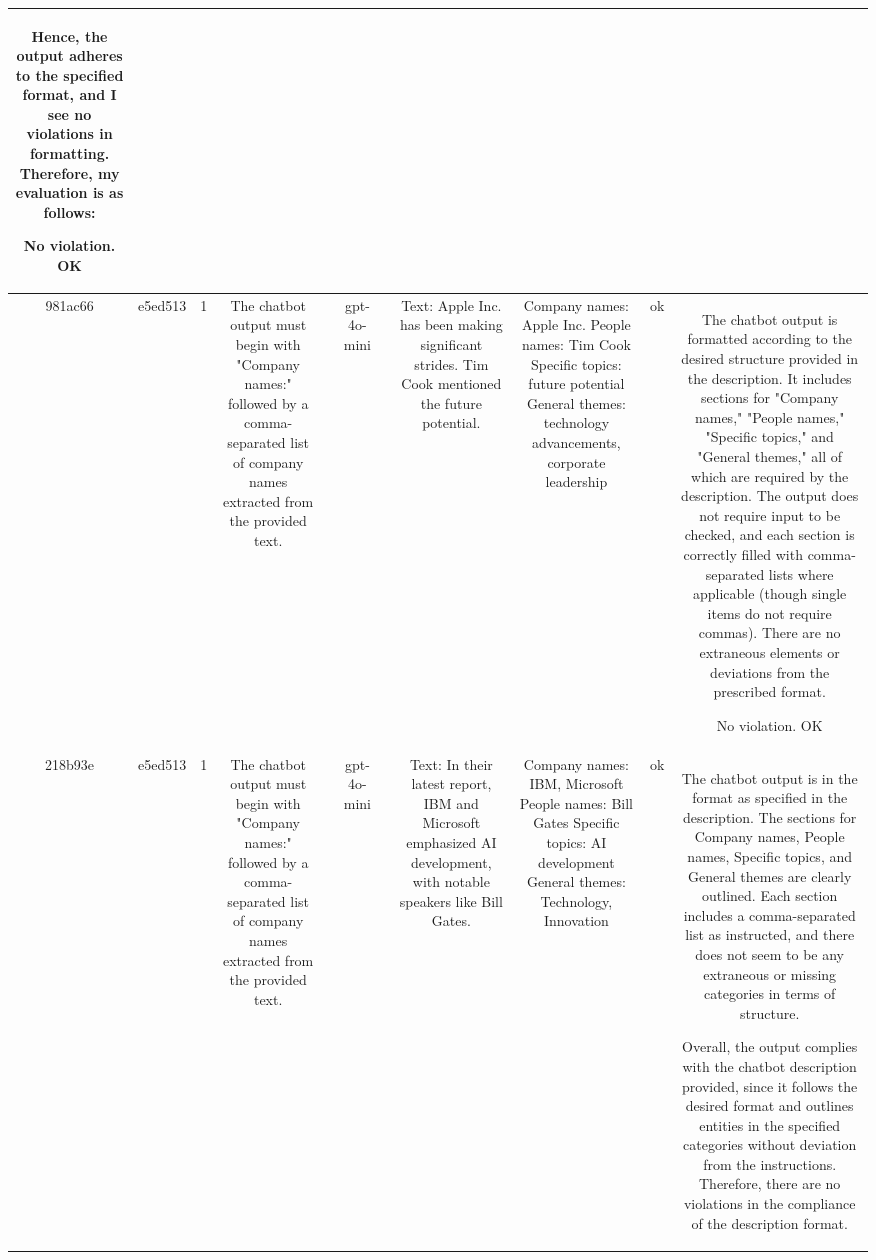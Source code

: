\begin{table}[h!]
\begin{tabular}{|c|c|c|c|c|c|c|c|c|c|c|}
Hence, the output adheres to the specified format, and I see no violations in formatting. Therefore, my evaluation is as follows:

No violation.
OK\\
\hline
981ac66 & e5ed513 & 1 & The chatbot output must begin with "Company names:" followed by a comma-separated list of company names extracted from the provided text. &  & gpt-4o-mini &  & Text: Apple Inc. has been making significant strides. Tim Cook mentioned the future potential. & Company names: Apple Inc.
People names: Tim Cook
Specific topics: future potential
General themes: technology advancements, corporate leadership & ok & The chatbot output is formatted according to the desired structure provided in the description. It includes sections for "Company names," "People names," "Specific topics," and "General themes," all of which are required by the description. The output does not require input to be checked, and each section is correctly filled with comma-separated lists where applicable (though single items do not require commas). There are no extraneous elements or deviations from the prescribed format.

No violation.
OK\\
\hline
218b93e & e5ed513 & 1 & The chatbot output must begin with "Company names:" followed by a comma-separated list of company names extracted from the provided text. &  & gpt-4o-mini &  & Text: In their latest report, IBM and Microsoft emphasized AI development, with notable speakers like Bill Gates. & Company names: IBM, Microsoft  
People names: Bill Gates  
Specific topics: AI development  
General themes: Technology, Innovation & ok & The chatbot output is in the format as specified in the description. The sections for Company names, People names, Specific topics, and General themes are clearly outlined. Each section includes a comma-separated list as instructed, and there does not seem to be any extraneous or missing categories in terms of structure.

Overall, the output complies with the chatbot description provided, since it follows the desired format and outlines entities in the specified categories without deviation from the instructions. Therefore, there are no violations in the compliance of the description format.


\end{tabular}
\end{table}
